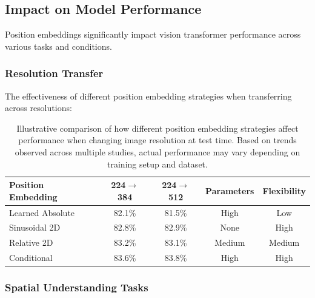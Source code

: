 \subsection{Impact on Model Performance}

Position embeddings significantly impact vision transformer performance across various tasks and conditions.

\subsubsection{Resolution Transfer}

The effectiveness of different position embedding strategies when transferring across resolutions:

\begin{table}[htbp]
\centering
\begin{tabular}{lcccc}
\toprule
\textbf{Position Embedding} & \textbf{224$\rightarrow$384} & \textbf{224$\rightarrow$512} & \textbf{Parameters} & \textbf{Flexibility} \\
\midrule
Learned Absolute & 82.1\% & 81.5\% & High & Low \\
Sinusoidal 2D & 82.8\% & 82.9\% & None & High \\
Relative 2D & 83.2\% & 83.1\% & Medium & Medium \\
Conditional & 83.6\% & 83.8\% & High & High \\
\bottomrule
\end{tabular}
\caption{Illustrative comparison of how different position embedding strategies affect performance when changing image resolution at test time. Based on trends observed across multiple studies, actual performance may vary depending on training setup and dataset.}

\end{table}

\subsubsection{Spatial Understanding Tasks}

